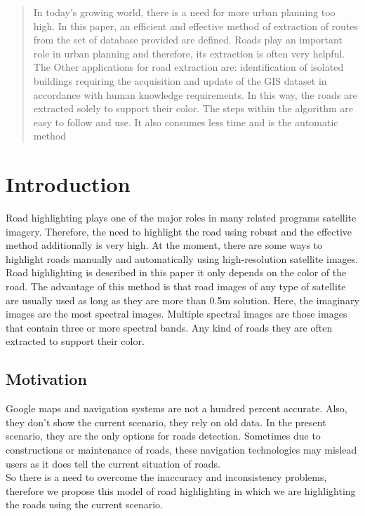 \documentclass[12pt,a4paper]{article}
\begin{document}

\begin{abstract}
In today's growing world, there is a need for more urban planning
too high. In this paper, an efficient and effective method of extraction
of routes from the set of database provided are defined. Roads play an important
role in urban planning and therefore, its extraction is often very helpful. The Other applications for road extraction are: identification of isolated buildings
requiring the acquisition and update of the GIS dataset in accordance with
human knowledge requirements. In this way, the roads are extracted solely to
support their color. The steps within the algorithm are easy to follow and
use. It also consumes less time and is the automatic method

\end{abstract}
\bigskip

\section{Introduction}
Road highlighting plays one of the major roles in many related programs
satellite imagery. Therefore, the need to highlight the road using robust and
the effective method additionally is very high.
At the moment, there are some ways to highlight roads manually and automatically using
high-resolution satellite images. Road highlighting is described in this paper
it only depends on the color of the road. The advantage of this method is that road
images of any type of satellite are usually used as long as they are more than 0.5m
solution. Here, the imaginary images are the most spectral images. Multiple spectral
images are those images that contain three or more spectral bands. Any kind of roads
they are often extracted to support their color.
\subsection{\textbf{Motivation}}
Google maps and navigation systems are not a hundred percent accurate. Also, they don’t show the current scenario, they rely on old data. In the present scenario, they are the only options for roads detection. Sometimes due to constructions or maintenance of roads, these navigation technologies may mislead users as it does tell the current situation of roads. \\
So there is a need to overcome the inaccuracy and inconsistency problems, therefore we propose this model of road highlighting in which we are highlighting the roads using the current scenario.
\end{document}
